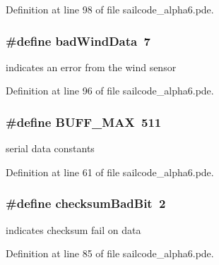 \-Definition at line 98 of file sailcode\-\_\-alpha6.\-pde.

\hypertarget{group__globalconstants_ga55cee1ec4df41dd9b7b71c6aa9619bfc}{
\subsubsection[{bad\-Wind\-Data}]{\setlength{\rightskip}{0pt plus 5cm}\#define bad\-Wind\-Data~7}}
\label{group__globalconstants_ga55cee1ec4df41dd9b7b71c6aa9619bfc}


indicates an error from the wind sensor 



\-Definition at line 96 of file sailcode\-\_\-alpha6.\-pde.

\hypertarget{group__globalconstants_ga2c1c653e45c4962f05cb6341f359707d}{
\subsubsection[{\-B\-U\-F\-F\-\_\-\-M\-A\-X}]{\setlength{\rightskip}{0pt plus 5cm}\#define \-B\-U\-F\-F\-\_\-\-M\-A\-X~511}}
\label{group__globalconstants_ga2c1c653e45c4962f05cb6341f359707d}


serial data constants 



\-Definition at line 61 of file sailcode\-\_\-alpha6.\-pde.

\hypertarget{group__globalconstants_gacd110736362ec97d7349dd67b527df39}{
\subsubsection[{checksum\-Bad\-Bit}]{\setlength{\rightskip}{0pt plus 5cm}\#define checksum\-Bad\-Bit~2}}
\label{group__globalconstants_gacd110736362ec97d7349dd67b527df39}


indicates checksum fail on data 



\-Definition at line 85 of file sailcode\-\_\-alpha6.\-pde.

